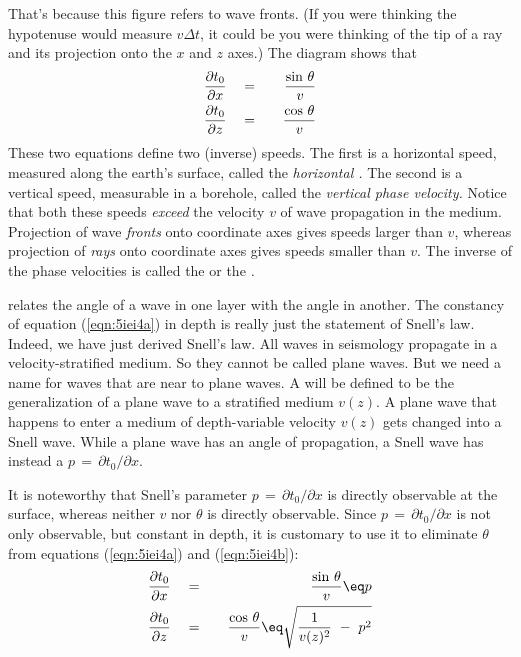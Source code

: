 That's because this figure refers to wave fronts.
(If you were thinking the hypotenuse would measure $v\Delta t$,
it could be you were thinking of the tip of a ray
and its projection onto the $x$ and $z$ axes.)
The diagram shows that
\begin{eqnarray}
{\partial t_0 \over \partial x} \ \ \ &=&\ \ \  { \sin \, \theta  \over v }
\label{eqn:5iei4a}
\\
{\partial t_0 \over \partial z} \ \ \ &=&\ \ \  { \cos \, \theta  \over v }
\label{eqn:5iei4b}
\end{eqnarray}
These two equations define two (inverse) speeds.
The first is a horizontal speed,
measured along the earth's surface,
called the
{\em
horizontal .
}
The second is a vertical speed, measurable in a borehole, called the
{\em
vertical phase velocity.
}
Notice that both these speeds
{\em  exceed}
the velocity  $v$  of wave propagation in the medium.
Projection of wave
{\em  fronts}
onto coordinate axes gives speeds larger than  $v$,
whereas projection of
{\em  rays}
onto coordinate axes gives speeds smaller than $v$.
The inverse of the phase velocities is called the
{\em  {}}
or the
{\em  {}.}
\par
{} relates the angle of a wave
in one layer with the angle in another.
The constancy of equation (\ref{eqn:5iei4a}) in depth is really just
the statement of Snell's law.
Indeed, we have just derived Snell's law.
All waves in seismology propagate in a
velocity-stratified medium.  So they cannot be called
plane waves.  But we need a name for waves that are
near to plane waves.  A %
{\em  {} %
} will be defined to be the generalization of a plane wave
to a stratified medium  $v(z)$.
A plane wave that happens to enter a medium
of depth-variable velocity  $v(z)$  gets changed into a Snell wave.
While a plane wave has an angle of propagation, a
Snell wave has instead a %
{\em  {} %
} $p\,=\,{\partial t_0}/{\partial x}$.
\par
It is noteworthy that
Snell's parameter  $p\,=\,{\partial t_0}/{\partial x}$  is directly
observable at the surface,
whereas neither  $v$  nor  $\theta$  is directly observable.
Since  $p\,=\,{\partial t_0}/{\partial x}$  is not only observable,
but constant in depth, it is customary to use it
to eliminate  $\theta$  from equations (\ref{eqn:5iei4a}) and (\ref{eqn:5iei4b}):
\begin{eqnarray}
{\partial t_0  \over \partial x} \ \ \ &=&\ \ \ {\sin\,\theta  \over v }\eq p
\label{eqn:5iei5a}
\\
{\partial t_0  \over \partial z}\ \ \ &=&\ \ \
{\cos\,\theta  \over v }\eq \sqrt{
 {1 \over v (z)^2}\ -\ p^2  }
\label{eqn:5iei5b}
\end{eqnarray}

